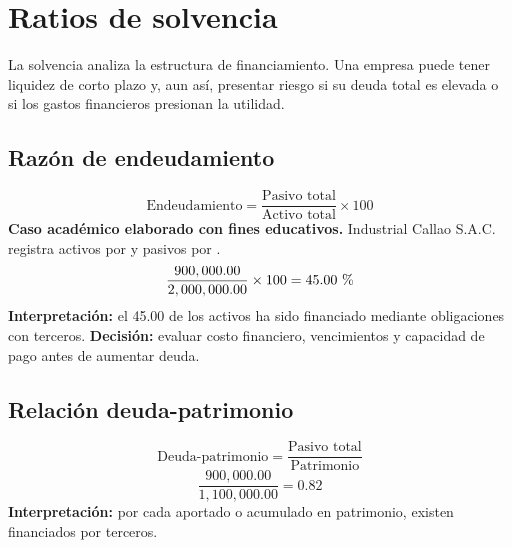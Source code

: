 \section{Ratios de solvencia}
La solvencia analiza la estructura de financiamiento. Una empresa puede tener liquidez de corto plazo y, aun así, presentar riesgo si su deuda total es elevada o si los gastos financieros presionan la utilidad.

\subsection{Razón de endeudamiento}
\[
\text{Endeudamiento}=\frac{\text{Pasivo total}}{\text{Activo total}}\times 100
\]
\textbf{Caso académico elaborado con fines educativos.} Industrial Callao S.A.C. registra activos por  y pasivos por .
\[
\frac{900,000.00}{2,000,000.00}\times 100=45.00\text{ \char37}
\]
\textbf{Interpretación:} el 45.00  de los activos ha sido financiado mediante obligaciones con terceros.
\textbf{Decisión:} evaluar costo financiero, vencimientos y capacidad de pago antes de aumentar deuda.

\subsection{Relación deuda-patrimonio}
\[
\text{Deuda-patrimonio}=\frac{\text{Pasivo total}}{\text{Patrimonio}}
\]
\[
\frac{900,000.00}{1,100,000.00}=0.82
\]
\textbf{Interpretación:} por cada  aportado o acumulado en patrimonio, existen  financiados por terceros.
